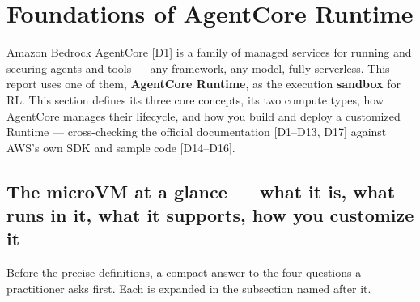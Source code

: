 \documentclass[
  paper=a4,
  ,captions=tableheading
]{scrartcl}
\begin{document}
\hypertarget{foundations-of-agentcore-runtime}{%
\section{Foundations of AgentCore
Runtime}\label{foundations-of-agentcore-runtime}}

Amazon Bedrock AgentCore {[}D1{]} is a family of managed services for
running and securing agents and tools --- any framework, any model,
fully serverless. This report uses one of them, \textbf{AgentCore
Runtime}, as the execution \textbf{sandbox} for RL. This section defines
its three core concepts, its two compute types, how AgentCore manages
their lifecycle, and how you build and deploy a customized Runtime ---
cross-checking the official documentation {[}D1--D13, D17{]} against
AWS's own SDK and sample code {[}D14--D16{]}.

\hypertarget{the-microvm-at-a-glance-what-it-is-what-runs-in-it-what-it-supports-how-you-customize-it}{%
\subsection{The microVM at a glance --- what it is, what runs in it,
what it supports, how you customize
it}\label{the-microvm-at-a-glance-what-it-is-what-runs-in-it-what-it-supports-how-you-customize-it}}

Before the precise definitions, a compact answer to the four questions a
practitioner asks first. Each is expanded in the subsection named after
it.
\end{document}
